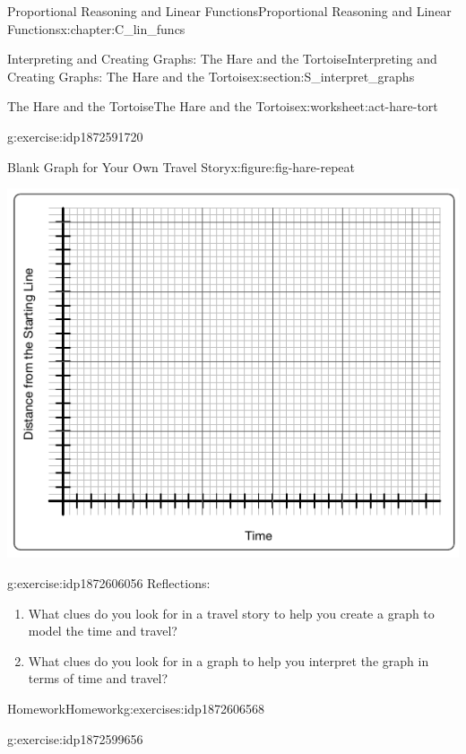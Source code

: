 \documentclass[oneside,10pt,]{book}
\numberwithin{equation}{chapter}
\begin{document}
\begin{chapterptx}{Proportional Reasoning and Linear Functions}{}{Proportional Reasoning and Linear Functions}{}{}{x:chapter:C_lin_funcs}
\begin{sectionptx}{Interpreting and Creating Graphs: The Hare and the Tortoise}{}{Interpreting and Creating Graphs: The Hare and the Tortoise}{}{}{x:section:S_interpret_graphs}
\begin{worksheet-subsection}{The Hare and the Tortoise}{}{The Hare and the Tortoise}{}{}{x:worksheet:act-hare-tort}
\begin{divisionexercise}{3}{}{}{g:exercise:idp1872591720}
\begin{figureptx}{Blank Graph for Your Own Travel Story}{x:figure:fig-hare-repeat}{}
\begin{image}{0.15}{0.7}{0.15}
\includegraphics[width=\linewidth]{external/hare-grid.pdf}
\end{image}%
\tcblower
\end{figureptx}%
\end{divisionexercise}%
\begin{divisionexercise}{4}{}{}{g:exercise:idp1872606056}%
Reflections:%
\begin{enumerate}[font=\bfseries,label=(\alph*),ref=\alph*]
\item{}What clues do you look for in a travel story to help you create a graph to model the time and travel?%
\item{}What clues do you look for in a graph to help you interpret the graph in terms of time and travel?%
\end{enumerate}
\end{divisionexercise}%
\end{worksheet-subsection}
\restoregeometry
%
%
\typeout{************************************************}
\typeout{************************************************}
%
\begin{exercises-subsection}{Homework}{}{Homework}{}{}{g:exercises:idp1872606568}
\begin{divisionexercise}{1}{}{}{g:exercise:idp1872599656}%

\end{divisionexercise}
\end{exercises-subsection}
\end{sectionptx}
\end{chapterptx}
\end{document}
